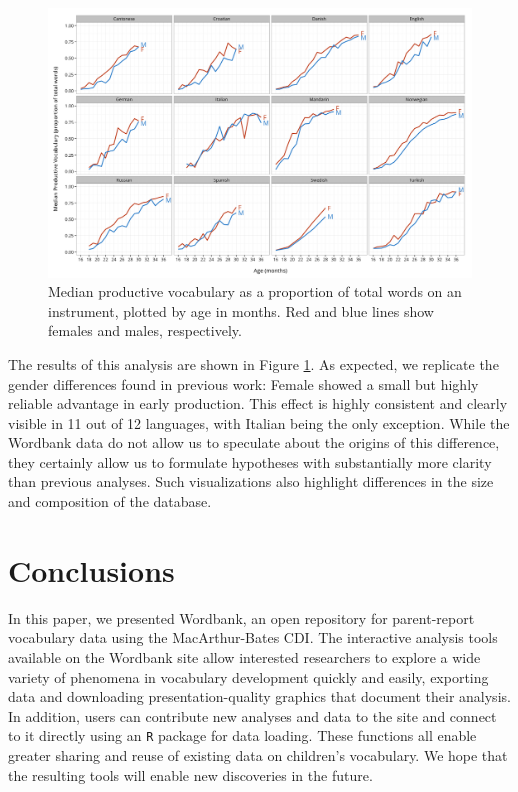 \documentclass[doc,noapacite]{apa2}
\begin{document}
\begin{figure}[h!]
\includegraphics[width=6in]{figures/gender.png}
\caption{\label{fig:gender} Median productive vocabulary as a proportion of total words on an instrument, plotted by age in months. Red and blue lines show females and males, respectively.}
\end{figure}

The results of this analysis are shown in Figure \ref{fig:gender}. As expected, we replicate the gender differences found in previous work: Female showed a small but highly reliable advantage in early production. This effect is highly consistent and clearly visible in 11 out of 12 languages, with Italian being the only exception. While the Wordbank data do not allow us to speculate about the origins of this difference, they certainly allow us to formulate hypotheses with substantially more clarity than previous analyses. Such visualizations also highlight differences in the size and composition of the database.

\section{Conclusions}

In this paper, we presented Wordbank, an open repository for parent-report vocabulary data using the MacArthur-Bates CDI. The interactive analysis tools available on the Wordbank site allow interested researchers to explore a wide variety of phenomena in vocabulary development quickly and easily, exporting data and downloading presentation-quality graphics that document their analysis. In addition, users can contribute new analyses and data to the site and connect to it directly using an \texttt{R} package for data loading. These functions all enable greater sharing and reuse of existing data on children's vocabulary. We hope that the resulting tools will enable new discoveries in the future.



\end{document}
